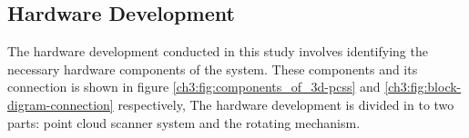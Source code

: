 

\subsection{Hardware Development}
\label{ch3:sec:hardaware_design}

The hardware development conducted in this study involves identifying the necessary hardware components of the system. These components and its connection is shown in figure \ref{ch3:fig:components_of_3d-pcss} and \ref{ch3:fig:block-digram-connection} respectively, The hardware development is divided in to two parts: point cloud scanner system and the rotating mechanism.

